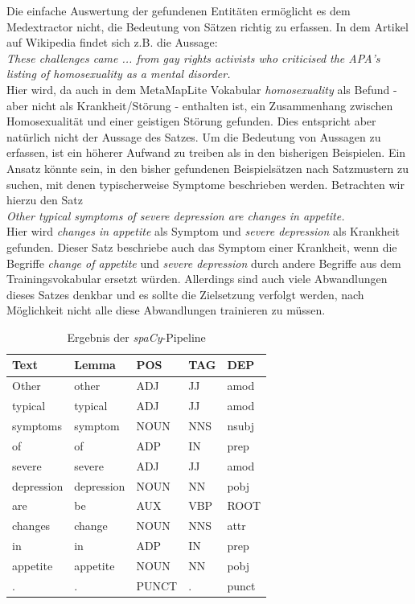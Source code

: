 Die einfache Auswertung der gefundenen Entitäten ermöglicht es dem Medextractor nicht, die Bedeutung von Sätzen richtig zu erfassen. In dem Artikel auf Wikipedia findet sich z.B. die Aussage:\\

\emph{\glqq These challenges came ... from gay rights activists who criticised the APA's listing of homosexuality as a mental disorder.\grqq}\\

Hier wird, da auch in dem MetaMapLite Vokabular \emph{homosexuality} als Befund - aber nicht als Krankheit/Störung - enthalten ist, ein Zusammenhang zwischen Homosexualität und einer geistigen Störung gefunden. Dies entspricht aber natürlich nicht der Aussage des Satzes. Um die Bedeutung von Aussagen zu erfassen, ist ein höherer Aufwand zu treiben als in den bisherigen Beispielen. Ein Ansatz könnte sein, in den bisher gefundenen Beispielsätzen nach Satzmustern zu suchen, mit denen typischerweise Symptome beschrieben werden. Betrachten wir hierzu den Satz\\

\emph{\glqq Other typical symptoms of severe depression are changes in appetite.\grqq}\\

Hier wird \emph{changes in appetite} als Symptom und \emph{severe depression} als Krankheit gefunden. Dieser Satz beschriebe auch das Symptom einer Krankheit, wenn die Begriffe \emph{change of appetite} und \emph{severe depression} durch andere Begriffe aus dem Trainingsvokabular ersetzt würden. Allerdings sind auch viele Abwandlungen dieses Satzes denkbar und es sollte die Zielsetzung verfolgt werden, nach Möglichkeit nicht alle diese Abwandlungen trainieren zu müssen.

\begin{table}
\centering
\begin{tabular}{lllll}
\hline
\textbf{Text}	& \textbf{Lemma}	& \textbf{POS} & \textbf{TAG} & \textbf{DEP} \\
\hline
Other & other & ADJ & JJ & amod \\
typical & typical & ADJ & JJ & amod \\
symptoms & symptom & NOUN & NNS & nsubj \\
of & of & ADP & IN & prep \\
severe & severe & ADJ & JJ & amod \\
depression & depression & NOUN & NN & pobj \\
are & be & AUX & VBP & ROOT \\
changes & change & NOUN & NNS & attr \\
in & in & ADP & IN & prep \\
appetite & appetite & NOUN & NN & pobj \\
.  & . & PUNCT & . & punct \\
\hline
\end{tabular}
\caption{Ergebnis der \emph{spaCy}-Pipeline}
\label{tab:spaCy2}
\end{table}

